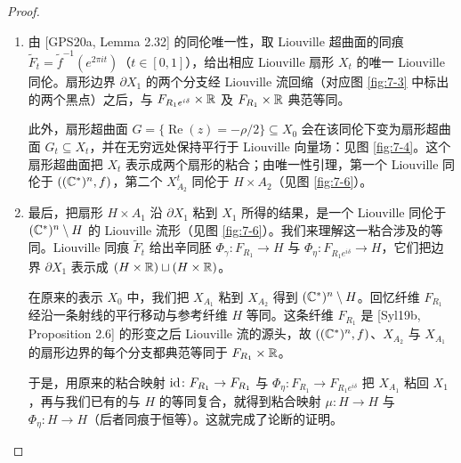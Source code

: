 \begin{proof}
\begin{enumerate}

\item 由 [GPS20a, Lemma 2.32] 的同伦唯一性，取 Liouville 超曲面的同痕 $\widetilde F_t=\tilde f^{-1}(e^{2\pi it})$（$t\in[0,1]$），给出相应 Liouville 扇形 $X_t$ 的唯一 Liouville 同伦。扇形边界 $\partial X_1$ 的两个分支经 Liouville 流回缩（对应图 \ref{fig:7-3} 中标出的两个黑点）之后，与 $F_{R_1e^{i\delta}}\times\mathbb{R}$ 及 $F_{R_1}\times\mathbb{R}$ 典范等同。

此外，扇形超曲面 $G=\{\operatorname{Re}(z)=-\rho/2\}\subseteq X_0$ 会在该同伦下变为扇形超曲面 $G_t\subseteq X_t$，并在无穷远处保持平行于 Liouville 向量场：见图 \ref{fig:7-4}。这个扇形超曲面把 $X_t$ 表示成两个扇形的粘合；由唯一性引理，第一个 Liouville 同伦于 $((\mathbb{C}^*)^n,f)$，第二个 $X^t_{A_2}$ 同伦于 $H\times A_2$（见图 \ref{fig:7-6}）。


\item 最后，把扇形 $H\times A_1$ 沿 $\partial X_1$ 粘到 $X_1$ 所得的结果，是一个 Liouville 同伦于 $(\mathbb{C}^*)^n\setminus H$ 的 Liouville 流形（见图 \ref{fig:7-6}）。我们来理解这一粘合涉及的等同。Liouville 同痕 $\widetilde F_t$ 给出辛同胚 $\Phi_\gamma\colon F_{R_1}\to H$ 与 $\Phi_\eta\colon F_{R_1e^{i\delta}}\to H$，它们把边界 $\partial X_1$ 表示成 $(H\times\mathbb{R})\sqcup(H\times\mathbb{R})$。

在原来的表示 $X_0$ 中，我们把 $X_{A_1}$ 粘到 $X_{A_2}$ 得到 $(\mathbb{C}^*)^n\setminus H$。回忆纤维 $F_{R_1}$ 经沿一条射线的平行移动与参考纤维 $H$ 等同。这条纤维 $F_{R_1}$ 是 [Syl19b, Proposition 2.6] 的形变之后 Liouville 流的源头，故 $((\mathbb{C}^*)^n,f)$、$X_{A_2}$ 与 $X_{A_1}$ 的扇形边界的每个分支都典范等同于 $F_{R_1}\times\mathbb{R}$。

于是，用原来的粘合映射 $\mathrm{id}\colon F_{R_1}\to F_{R_1}$ 与 $\Phi_\eta\colon F_{R_1}\to F_{R_1e^{i\delta}}$ 把 $X_{A_1}$ 粘回 $X_1$，再与我们已有的与 $H$ 的等同复合，就得到粘合映射 $\mu\colon H\to H$ 与 $\Phi_\eta\colon H\to H$（后者同痕于恒等）。这就完成了论断的证明。
\end{enumerate}
\end{proof}


